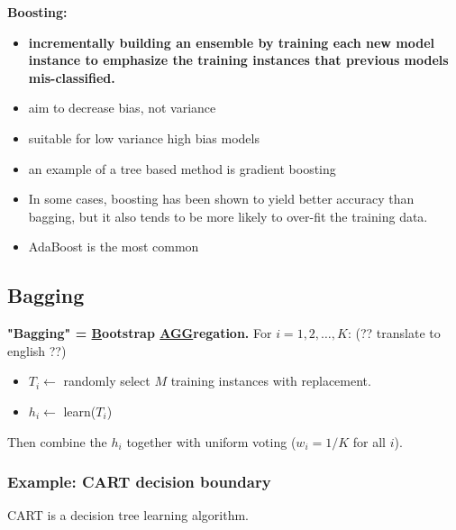 \textbf{Boosting:}  %
\begin{itemize}
	\item \textbf{incrementally building an ensemble by training each new model instance to emphasize the training instances that previous models mis-classified.} 
	\item aim to decrease bias, not variance
	\item suitable for low variance high bias models
	\item an example of a tree based method is gradient boosting
	\item In some cases, boosting has been shown to yield better accuracy than bagging, but it also tends to be more likely to over-fit the training data. %
	\item AdaBoost is the most common
\end{itemize}


\subsection{Bagging}
\textbf{"Bagging" = \underline{B}ootstrap \underline{AGG}regation.}
For $i = 1, 2, \dots, K$:   (?? translate to english ??) 
\begin{itemize}
	\item $T_i \leftarrow$ randomly select $M$ training instances with replacement.
	\item $h_i \leftarrow$ learn($T_i$)
\end{itemize}
Then combine the $h_i$ together with uniform voting ($w_i = 1/K$ for all $i$).

\subsubsection{Example: CART decision boundary}
CART is a decision tree learning algorithm. \hfill \\

